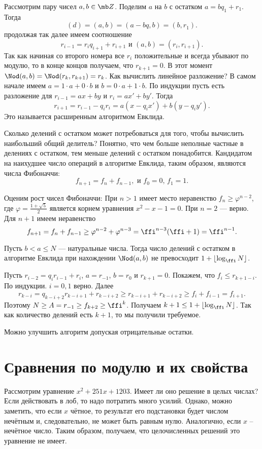 Рассмотрим пару чисел $a,b\in \mb Z$. Поделим $a$ на $b$ с остатком $a=bq_1+r_1$. Тогда $$(d)=(a,b)=(a-bq,b)=(b,r_1).$$
продолжая так далее имеем соотношение
$$r_{i-1}=r_iq_{i+1}+r_{i+1}  \text{ и $(a,b)=(r_i,r_{i+1})$}.$$
Так как начиная со второго номера все $r_i$ положительные и всегда убывают по модулю, то в конце концов получаем, что $r_{k+1}=0$.
В этот момент  $\Nod(a,b)=\Nod(r_k,r_{k+1})=r_k$. Как вычислить линейное разложение? В самом начале имеем $a=1\cdot a+0\cdot b$ и $b=0\cdot a+ 1\cdot b$. По индукции пусть есть разложение для $r_{i-1}=ax+by$ и $r_i=ax'+by'$. Тогда $$r_{i+1}=r_{i-1}-q_ir_{i}=a(x-q_ix')+b(y-q_iy').$$
Это называется расширенным алгоритмом Евклида.

Сколько делений с остатком может потребоваться для того, чтобы вычислить наибольший общий делитель?
Понятно, что чем больше неполные частные в делениях с остатком, тем меньше делений с остатком понадобится. Кандидатом на наихудшее число операций в алгоритме Евклида, таким образом, являются числа Фибоначчи:
$$f_{n+1}=f_n+f_{n-1}, \text{ и $f_0=0$, $f_1=1$}.$$

Оценим рост чисел Фибоначчи:
\lm При $n>1$ имеет место неравенство $f_n\geq \varphi^{n-2}$, где $\varphi=\frac{1+\sqrt{5}}{2}$ является корнем уравнения $x^2-x-1=0$. 
\elm
\proof При $n=2$ --- верно. Для $n+1$ имеем неравенство
 $$f_{n+1}=f_n+f_{n-1}\geq \varphi^{n-2}+\varphi^{n-3}=\ffi^{n-3}(\ffi+1)=\ffi^{n-1}.$$
\endproof

\thrm Пусть $b<a\leq N$ --- натуральные числа. Тогда число делений с остатком в алгоритме Евклида при нахождении $\Nod(a,b)$  не превосходит $1+\left\lfloor \log_{\ffi} N\right\rfloor$. 
\ethrm

\proof Пусть $r_{i-2}=q_{i}r_{i-1}+r_i$, $a=r_{-1}$, $b=r_0$ и $r_{k+1}=0$. Покажем, что $f_i\leq r_{k+1-i}$. По индукции. $i=0,1$ верно. Далее
$$r_{k-i}=q_{k-i+2}r_{k-i+1}+r_{k-i+2}\geq r_{k-i+1}+r_{k-i+2}\geq f_i+f_{i-1}=f_{i+1}.$$
Поэтому $N\geq A=r_{-1}\geq f_{k+2} \geq \ffi^k$. Получаем $k+1\leq 1+\left\lfloor \log_{\ffi} N\right\rfloor$. Так как количество делений есть $k+1$, то мы получили требуемое.
\endproof

\rm Можно улучшить алгоритм допуская отрицательные остатки.
\erm

\section{Сравнения по модулю и их свойства} 
Рассмотрим уравнение $x^2+251x+1203$. Имеет ли оно решение в целых числах? Если действовать в лоб, то надо потратить много усилий. Однако, можно заметить, что если $x$ чётное, то результат его подстановки будет числом нечётным и, следовательно, не может быть равным нулю. Аналогично, если $x$ -- нечётное число. Таким образом, получаем, что целочисленных решений это уравнение не имеет. 

